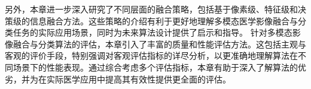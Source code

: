 另外，本章进一步深入研究了不同层面的融合策略，包括基于像素级、特征级和决策级的信息融合方法。这些策略的介绍有利于更好地理解多模态医学影像融合与分类任务的实际应用场景，同时为未来算法设计提供了启示和指导。
针对多模态影像融合与分类算法的评估，本章引入了丰富的质量和性能评估方法。这包括主观与客观的评价手段，特别强调对客观评估指标的详尽分析，以更准确地理解算法在不同场景下的性能表现。通过综合考虑多个评估指标，本章有助于深入了解算法的优劣，并为在实际医学应用中提高其有效性提供更全面的评估。
